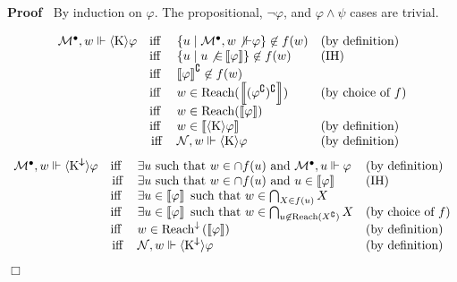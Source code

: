 \documentclass{article}
\newcommand{\nin}{\not\in}
\newcommand{\tmmathbf}[1]{\ensuremath{\boldsymbol{#1}}}
\newcommand{\tmop}[1]{\ensuremath{\operatorname{#1}}}
\newcommand{\tmtextbf}[1]{\text{{\bfseries{#1}}}}
\newenvironment{proof}{\noindent\textbf{Proof\ }}{\hspace*{\fill}$\Box$\medskip}
\newcommand{\Model}{\ensuremath{\mathcal{M}}}
\newcommand{\Net}{\ensuremath{\mathcal{N}}}
\newcommand{\semantics}[1]{\left\llbracket #1 \right\rrbracket}
\newcommand{\diaKnow}{\langle \tmmathbf{\text{K}} \rangle}
\newcommand{\diaKnownby}{\langle \tmmathbf{\text{K}^{\downarrow}} \rangle}
\newcommand{\Reach}{\textsf{\tmop{Reach}}}
\newcommand{\Reachedby}{\textsf{\tmop{Reach}}^{\downarrow}}
\begin{document}
\begin{proof}
  By induction on $\varphi$. The propositional, $\neg \varphi$, and $\varphi
  \wedge \psi$ cases are trivial.
  \begin{description}
    \tmtextbf{$\diaKnow \varphi$ case:}
    \[ \begin{array}{lcll}
         \Model^{\bullet}, w \Vdash \diaKnow \varphi & \text{iff } & \left\{ u
         \mid \Model^{\bullet}, w \not{\Vdash} \varphi \right\} \nin f (w) &
         \text{(by definition)}\\
         & \text{iff } & \left\{ u \mid u \not{\in} \semantics{\varphi}
         \right\} \nin f (w) & \text{(IH)}\\
         & \text{iff } & \semantics{\varphi}^{\complement} \nin f (w) & \\
         & \text{iff } & w \in \Reach
         (\semantics{(\varphi^{\complement})^{\complement}}) & \text{(by
         choice of } f)\\
         & \text{iff } & w \in \Reach (\semantics{\varphi}) & \\
         & \text{iff } & w \in \semantics{\diaKnow \varphi} & \text{(by
         definition)}\\
         & \tmop{iff} & \Net, w \Vdash \diaKnow \varphi & \text{(by
         definition)}
       \end{array} \]
    \tmtextbf{$\diaKnownby \varphi$ case:}
    \[ \begin{array}{lcll}
         \Model^{\bullet}, w \Vdash \diaKnownby \varphi & \text{iff } &
         \exists u \text{ such that } w \in \cap f (u) \text{ and }
         \Model^{\bullet}, u \Vdash \varphi & \text{(by definition)}\\
         & \tmop{iff} & \exists u \text{ such that } w \in \cap f (u) \text{
         and } u \in \semantics{\varphi} & \text{(IH)}\\
         & \text{iff } & \exists u \in \semantics{\varphi} \text{ such that }
         w \in \bigcap_{X \in f (u)} X & \\
         & \text{iff } & \exists u \in \semantics{\varphi} \text{ such that }
         w \in \bigcap_{u \not{\in} \Reach (X^{\complement})} X & \text{(by
         choice of $f$)}\\
         & \text{iff } & w \in \Reachedby \left( \semantics{\varphi} \right)
         & \text{(by definition)}\\
         & \tmop{iff} & \Net, w \Vdash \diaKnownby \varphi & \text{(by
         definition)}
       \end{array} \]

\end{description}
\end{proof}
\end{document}
